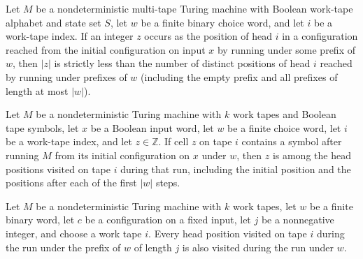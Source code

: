 \begin{theorem}
\label{Turing.NDTM.abs_lt_card_visitedWith}
\leanok
{}
Let $M$ be a nondeterministic multi-tape Turing machine with Boolean work-tape alphabet
and state set $S$, let $w$ be a finite binary choice word, and let $i$ be a work-tape
index. If an integer $z$ occurs as the position of head $i$ in a configuration reached
from the initial configuration on input $x$ by running under some prefix of $w$, then
$|z|$ is strictly less than the number of distinct positions of head $i$ reached by
running under prefixes of $w$ (including the empty prefix and all prefixes of length at
most $|w|$).
\end{theorem}

\begin{theorem}
\label{Turing.NDTM.mem_visitedWith_of_ne_none}
\leanok
{}
Let $M$ be a nondeterministic Turing machine with $k$ work tapes and Boolean tape
symbols, let $x$ be a Boolean input word, let $w$ be a finite choice word, let $i$ be a
work-tape index, and let $z\in\mathbb{Z}$. If cell $z$ on tape $i$ contains a symbol
after running $M$ from its initial configuration on $x$ under $w$, then $z$ is among the
head positions visited on tape $i$ during that run, including the initial position and
the positions after each of the first $|w|$ steps.
\end{theorem}

\begin{theorem}
\label{Turing.NDTM.visitedWith_take_subset}
\leanok
{}
Let $M$ be a nondeterministic Turing machine with $k$ work tapes, let $w$ be a finite
binary word, let $c$ be a configuration on a fixed input, let $j$ be a nonnegative
integer, and choose a work tape $i$. Every head position visited on tape $i$ during the
run under the prefix of $w$ of length $j$ is also visited during the run under $w$.
\end{theorem}

